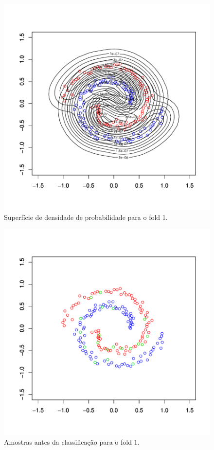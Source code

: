 \documentclass[12pt]{article}
\begin{document}
\begin{figure}[h]
\centering
\includegraphics{KDE-005}
\caption{Superfície de densidade de probabilidade para o fold 1.}
\label{9}
\end{figure}

\begin{figure}[h]
\centering
\includegraphics{KDE-006}
\caption{Amostras antes da classificação para o fold 1.}
\label{10}
\end{figure}
\end{document}
